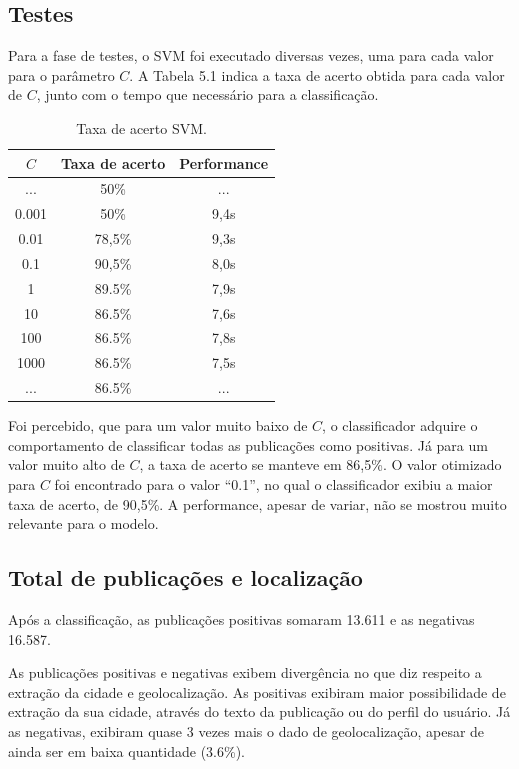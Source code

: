 \subsection*{Testes}

Para a fase de testes, o SVM foi executado diversas vezes, uma para cada valor para o parâmetro $C$. A Tabela 5.1 indica a taxa de acerto obtida para cada valor de $C$, junto com o tempo que necessário para a classificação.

\begin{table}[ht]
  \caption{Taxa de acerto SVM.}
  \centering
  \begin{tabular}{| c | c | c |}
    \hline
    \textbf{$C$} & \textbf{Taxa de acerto} & \textbf{Performance} \\ [0.5ex] \hline \hline
    ... & 50\% & ... \\ \hline
    0.001 & 50\% & 9,4s \\ \hline
    0.01 & 78,5\% & 9,3s \\ \hline
    0.1 & 90,5\% & 8,0s \\ \hline
    1 & 89.5\% & 7,9s \\ \hline
    10 & 86.5\% & 7,6s \\ \hline
    100 & 86.5\% & 7,8s \\ \hline
    1000 & 86.5\% & 7,5s \\ \hline
    ... & 86.5\% & ... \\ [1ex]
    \hline
  \end{tabular}
  \label{table:nonlin}
\end{table}

Foi percebido, que para um valor muito baixo de $C$, o classificador adquire o comportamento de classificar todas as publicações como positivas. Já para um valor muito alto de $C$, a taxa de acerto se manteve em 86,5\%. O valor otimizado para $C$ foi encontrado para o valor ``0.1'', no qual o classificador exibiu a maior taxa de acerto, de 90,5\%. A performance, apesar de variar, não se mostrou muito relevante para o modelo.

\subsection*{Total de publicações e localização}

Após a classificação, as publicações positivas somaram 13.611 e as negativas 16.587. 

As publicações positivas e negativas exibem divergência no que diz respeito a extração da cidade e geolocalização. As positivas exibiram maior possibilidade de extração da sua cidade, através do texto da publicação ou do perfil do usuário. Já as negativas, exibiram quase 3 vezes mais o dado de geolocalização, apesar de ainda ser em baixa quantidade (3.6\%).

